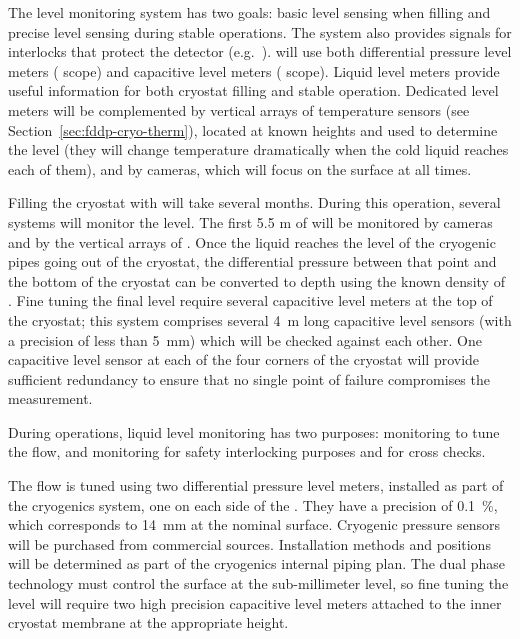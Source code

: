The \lar level monitoring system has two goals: basic level sensing when filling and precise level sensing during stable operations. The system also provides signals for  interlocks that protect the detector (e.g.\ ).  will use both differential pressure level meters ( scope) and capacitive level meters ( scope). Liquid level meters provide useful information for both cryostat filling and stable operation. Dedicated level meters will be complemented by vertical arrays of temperature sensors (see Section~\ref{sec:fddp-cryo-therm}), located at known heights and used to determine the \lar level (they will change temperature dramatically when the cold liquid reaches each of them), and by cameras, which will focus on the \lar surface at all times.  

Filling the cryostat with \lar will take several months. During this operation, several systems will monitor the \lar level. 
The first 5.5 m of  will be monitored by cameras and by the vertical arrays of . Once the liquid reaches the level of the cryogenic pipes going out of the cryostat, 
the differential pressure between that point and the bottom of the cryostat
can be converted to depth using
the known density of \lar.  Fine tuning the final \lar level require several capacitive level meters at the top of the cryostat; this system comprises several 4~m long capacitive level sensors (with a precision of less than 5~mm) which will be checked against each other. One capacitive level sensor at each of the four corners of the cryostat will provide sufficient redundancy to ensure that no single point of failure compromises the %
measurement.


During operations, liquid level monitoring has two purposes:
monitoring to tune the \lar flow, and monitoring for safety interlocking purposes and for cross checks. 


The \lar flow is tuned using two differential pressure level meters, installed as part of the cryogenics system, one on each side of the .  They have a precision of \SI{0.1}{\%}, which corresponds to \SI{14}{mm} at the nominal \lar surface. Cryogenic pressure sensors will be purchased from commercial sources. Installation methods and positions will be determined as part of the cryogenics internal piping plan. 
The dual phase technology must control the \lar surface at the sub-millimeter level, so fine tuning the \lar level will require two high precision capacitive level meters attached to the inner cryostat membrane at the appropriate height.   


